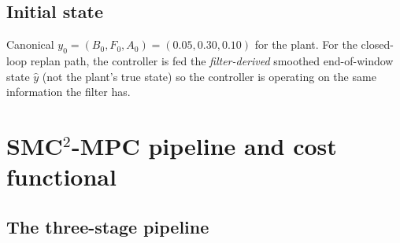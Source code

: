 \documentclass[11pt,a4paper]{article}
\begin{document}
\subsection{Initial state}

Canonical $y_0 = (B_0, F_0, A_0) = (0.05, 0.30, 0.10)$ for the plant.
For the closed-loop replan path, the controller is fed the
\emph{filter-derived} smoothed end-of-window state $\hat y$ (not the
plant's true state) so the controller is operating on the same
information the filter has.


\section{SMC$^2$-MPC pipeline and cost functional}
\label{sec:smc2}

\subsection{The three-stage pipeline}
\end{document}
